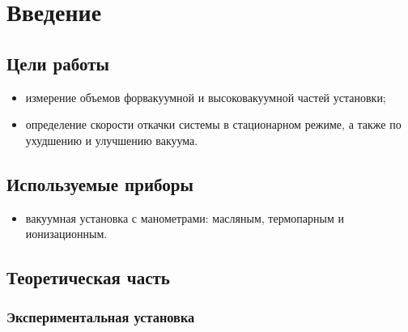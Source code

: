 \section{Введение}
\subsection{Цели работы} 
\begin{itemize}
    \item измерение объемов форвакуумной и высоковакуумной частей установки;
    \item определение скорости откачки системы в стационарном режиме, а также по ухудшению и улучшению вакуума.
\end{itemize}

\subsection{Используемые приборы}
\begin{itemize}
    \item вакуумная установка с манометрами: масляным, термопарным и ионизационным.
\end{itemize}

\subsection{Теоретическая часть}



\subsubsection{Экспериментальная установка}


